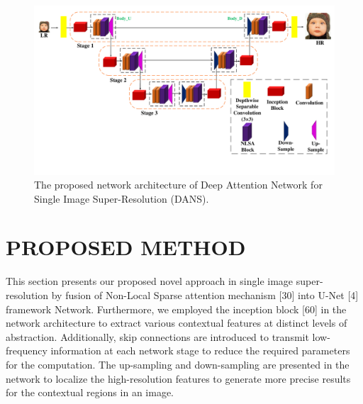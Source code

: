 \documentclass{ieeeaccess}
\begin{document}
\begin{figure}
    \centering

    \includegraphics[width=\linewidth]{2Figure.pdf}
    \caption{The proposed network architecture of Deep Attention Network for Single Image Super-Resolution (DANS).}
    \label{fig:2}
\end{figure}

\section{PROPOSED METHOD}

This section presents our proposed novel approach in single image super-resolution by fusion of Non-Local Sparse attention mechanism [30] into U-Net [4] framework Network. Furthermore, we employed the inception block [60] in the network architecture to extract various contextual features at distinct levels of abstraction. Additionally, skip connections are introduced to transmit low-frequency information at each network stage to reduce the required parameters for the computation. The up-sampling and down-sampling are presented in the network to localize the high-resolution features to generate more precise results for the contextual regions in an image.
\end{document}
